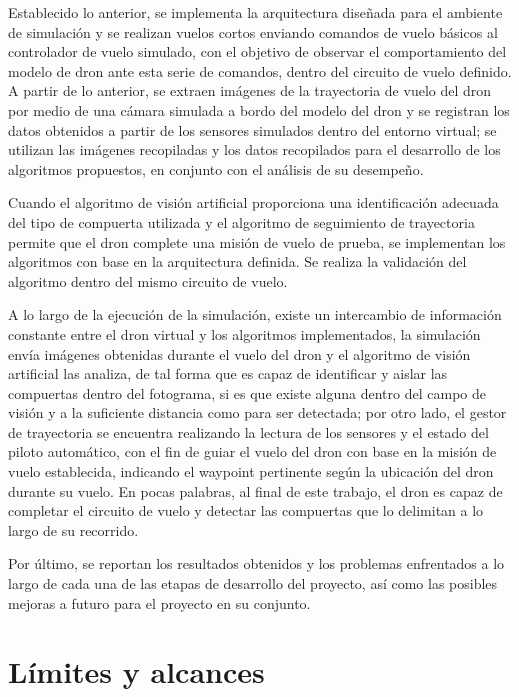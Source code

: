 Establecido lo anterior, se implementa la arquitectura diseñada para el ambiente de simulación y se realizan vuelos cortos enviando comandos de vuelo básicos al controlador de vuelo simulado, con el objetivo de observar el comportamiento del modelo de dron ante esta serie de comandos, dentro del circuito de vuelo definido. A partir de lo anterior, se extraen imágenes de la trayectoria de vuelo del dron por medio de una cámara simulada a bordo del modelo del dron y se registran los datos obtenidos a partir de los sensores simulados dentro del entorno virtual; se utilizan las imágenes recopiladas y los datos recopilados para el desarrollo de los algoritmos propuestos, en conjunto con el análisis de su desempeño.

Cuando el algoritmo de visión artificial proporciona una identificación adecuada del tipo de compuerta utilizada y el algoritmo de seguimiento de trayectoria permite que el dron complete una misión de vuelo de prueba, se implementan los algoritmos con base en la arquitectura definida. Se realiza la validación del algoritmo dentro del mismo circuito de vuelo. 

A lo largo de la ejecución de la simulación, existe un intercambio de información constante entre el dron virtual y los algoritmos implementados, la simulación envía imágenes obtenidas durante el vuelo del dron y el algoritmo de visión artificial las analiza, de tal forma que es capaz de identificar y aislar las compuertas dentro del fotograma, si es que existe alguna dentro del campo de visión y a la suficiente distancia como para ser detectada; por otro lado, el gestor de trayectoria se encuentra realizando la lectura de los sensores y el estado del piloto automático, con el fin de guiar el vuelo del dron con base en la misión de vuelo establecida, indicando el waypoint pertinente según la ubicación del dron durante su vuelo. En pocas palabras, al final de este trabajo, el dron es capaz de completar el circuito de vuelo y detectar las compuertas que lo delimitan a lo largo de su recorrido.

Por último, se reportan los resultados obtenidos y los problemas enfrentados a lo largo de cada una de las etapas de desarrollo del proyecto, así como las posibles mejoras a futuro para el proyecto en su conjunto.



\section{Límites y alcances}

